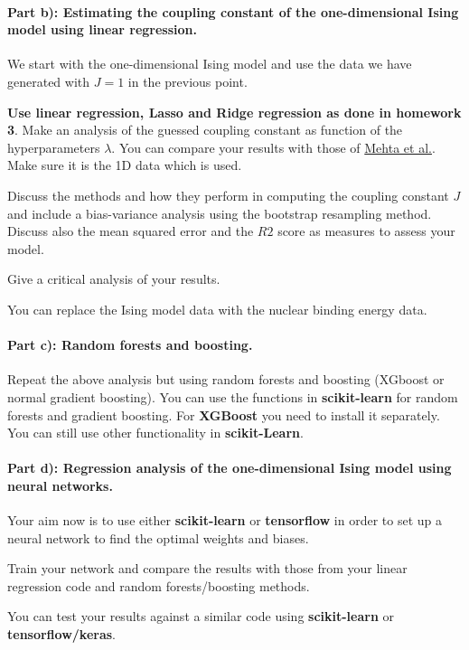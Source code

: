 \documentclass[%
oneside,                 %
final,                   %
10pt]{article}
\begin{document}
\paragraph{Part b): Estimating the coupling constant of the one-dimensional Ising model using linear regression.}
We start with the one-dimensional Ising model and use the data we have
generated with $J=1$ in the previous point.

\textbf{Use linear regression,
Lasso and Ridge regression as done in homework 3}.
Make an analysis of the guessed coupling constant as function of the hyperparameters $\lambda$. 
You can compare your
results with those of \href{{https://physics.bu.edu/~pankajm/ML-Notebooks/HTML/NB_CVI-linreg_ising.html}}{Mehta
et al.}.
Make sure it is the 1D data which is used.

Discuss the methods and how they perform in computing the coupling
constant $J$ and include a bias-variance analysis using the bootstrap resampling method.
Discuss also the mean squared error and
the $R2$ score as measures to assess your model.

Give a critical analysis of your results.


You can replace the Ising model data with the nuclear binding energy data.



\paragraph{Part c): Random forests and boosting.}
Repeat the above analysis but using random forests and boosting (XGboost or normal gradient boosting). You can use the functions
in \textbf{scikit-learn} for random forests and gradient boosting. For \textbf{XGBoost} you need to install it separately. You can still use other functionality in \textbf{scikit-Learn}. 

\paragraph{Part d): Regression analysis of the one-dimensional Ising model using neural networks.}
Your aim now is to use either \textbf{scikit-learn} or \textbf{tensorflow} in order to set up a neural network to find the optimal weights and biases. 

Train your network and compare the results with those from your linear regression code and random forests/boosting methods. 

You can test your results against a similar code using \textbf{scikit-learn} or \textbf{tensorflow/keras}. 
\end{document}
